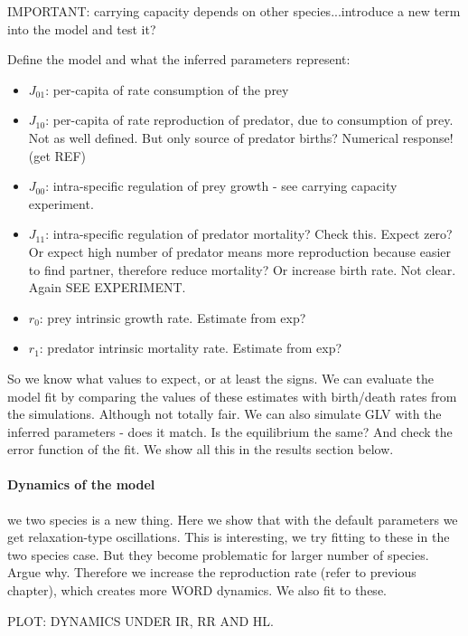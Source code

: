 IMPORTANT: carrying capacity depends on other species...introduce a new term into the model and test it?

Define the model and what the inferred parameters represent:

\begin{itemize}
	\item $J_{01}$: per-capita of rate consumption of the prey
	\item $J_{10}$: per-capita of rate reproduction of predator, due to consumption of prey. Not as well defined. But only source of predator births? Numerical response! (get REF)
	
	\item $J_{00}$: intra-specific regulation of prey growth - see carrying capacity experiment.
	
	\item $J_{11}$: intra-specific regulation of predator mortality? Check this. Expect zero? Or expect high number of predator means more reproduction because easier to find partner, therefore reduce mortality? Or increase birth rate. Not clear. Again SEE EXPERIMENT. 
	
	\item $r_0$: prey intrinsic growth rate. Estimate from exp?
	
	\item $r_1$: predator intrinsic mortality rate. Estimate from exp?
\end{itemize}

So we know what values to expect, or at least the signs. We can evaluate the model fit by comparing the values of these estimates with birth/death rates from the simulations. Although not totally fair. We can also simulate GLV with the inferred parameters - does it match. Is the equilibrium the same? And check the error function of the fit. We show all this in the results section below.

\paragraph*{Dynamics of the model} we two species is a new thing. Here we show that with the default parameters we get relaxation-type oscillations. This is interesting, we try fitting to these in the two species case. But they become problematic for larger number of species. Argue why. Therefore we increase the reproduction rate (refer to previous chapter), which creates more WORD dynamics. We also fit to these. 

PLOT: DYNAMICS UNDER IR, RR AND HL.

